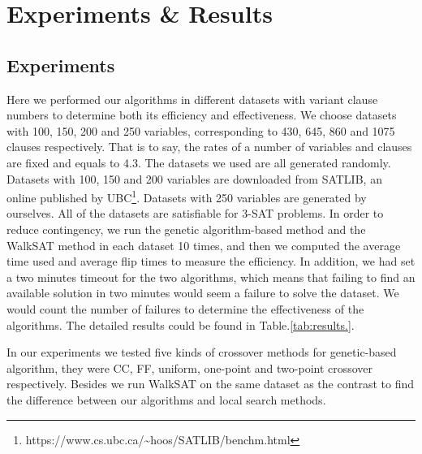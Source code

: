 
\section{Experiments \& Results}
\subsection{Experiments}
Here we performed our algorithms in different datasets with variant clause numbers to determine both its efficiency and effectiveness. We choose datasets with 100, 150, 200 and 250 variables, corresponding to 430, 645, 860 and 1075 clauses respectively. That is to say, the rates of a number of variables and clauses are fixed and equals to 4.3. The datasets we used are all generated randomly. Datasets with 100, 150 and 200 variables are downloaded from SATLIB, an online published by UBC\footnote{https://www.cs.ubc.ca/\textasciitilde hoos/SATLIB/benchm.html}. Datasets with 250 variables are generated by ourselves. All of the datasets are satisfiable for 3-SAT problems. In order to reduce contingency, we run the genetic algorithm-based method and the WalkSAT method in each dataset 10 times, and then we computed the average time used and average flip times to measure the efficiency. In addition, we had set a two minutes timeout for the two algorithms, which means that failing to find an available solution in two minutes would seem a failure to solve the dataset. We would count the number of failures to determine the effectiveness of the algorithms. The detailed results could be found in Table.\ref{tab:results.}.

In our experiments we tested five kinds of crossover methods for genetic-based algorithm, they were CC, FF, uniform, one-point and two-point crossover respectively. Besides we run WalkSAT on the same dataset as the contrast to find the difference between our algorithms and local search methods.

